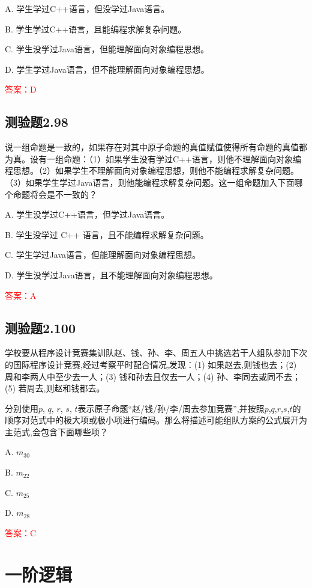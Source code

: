 \documentclass[UTF8, heading=true]{ctexart}
\begin{document}
A. 学生学过C++语言，但没学过Java语言。

B. 学生学过C++语言，且能编程求解复杂问题。

C. 学生没学过Java语言，但能理解面向对象编程思想。

D. 学生学过Java语言，但不能理解面向对象编程思想。

\textcolor{red}{答案：D}

\subsection{测验题2.98}

说一组命题是一致的，如果存在对其中原子命题的真值赋值使得所有命题的真值都为真。设有一组命题：（1）如果学生没有学过C++语言，则他不理解面向对象编程思想。（2）如果学生不理解面向对象编程思想，则他不能编程求解复杂问题。（3）如果学生学过Java语言，则他能编程求解复杂问题。这一组命题加入下面哪个命题将会是不一致的？

A. 学生没学过C++语言，但学过Java语言。

B. 学生没学过 C++ 语言，且不能编程求解复杂问题。

C. 学生学过Java语言，但能理解面向对象编程思想。

D. 学生没学过Java语言，且不能理解面向对象编程思想。

\textcolor{red}{答案：A}

\subsection{测验题2.100}

学校要从程序设计竞赛集训队赵、钱、孙、李、周五人中挑选若干人组队参加下次的国际程序设计竞赛,经过考察平时配合情况,发现：(1) 如果赵去,则钱也去；(2) 周和李两人中至少去一人；(3) 钱和孙去且仅去一人；(4) 孙、李同去或同不去；(5) 若周去,则赵和钱都去。

分别使用$p$, $q$, $r$, $s$, $t$表示原子命题“赵/钱/孙/李/周去参加竞赛”,并按照$p$,$q$,$r$,$s$,$t$的顺序对范式中的极大项或极小项进行编码。那么将描述可能组队方案的公式展开为主范式,会包含下面哪些项？

A. $ m_{30}$

B. $ m_{22}$

C. $ m_{25}$

D. $ m_{28}$

\textcolor{red}{答案：C}


\clearpage
\section{一阶逻辑}
\end{document}

